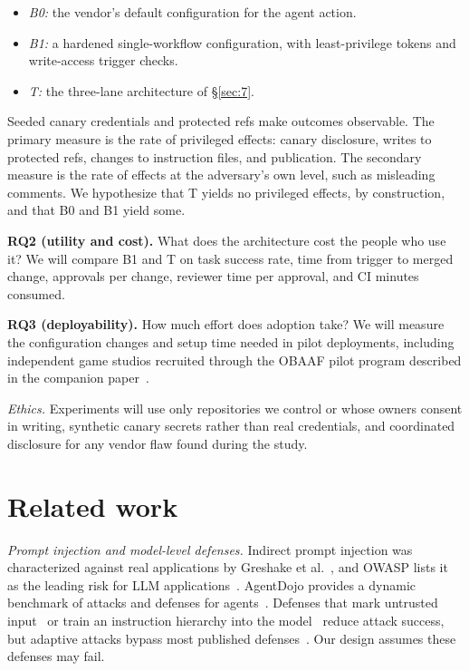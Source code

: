 \documentclass[acmsmall,screen,review]{acmart}
\begin{document}
\begin{itemize}
\item \emph{B0:} the vendor's default configuration for the agent action.
\item \emph{B1:} a hardened single-workflow configuration, with least-privilege tokens and write-access trigger checks.
\item \emph{T:} the three-lane architecture of \S\ref{sec:7}.
\end{itemize}

Seeded canary credentials and protected refs make outcomes observable. The primary measure is the rate of privileged effects: canary disclosure, writes to protected refs, changes to instruction files, and publication. The secondary measure is the rate of effects at the adversary's own level, such as misleading comments. We hypothesize that T yields no privileged effects, by construction, and that B0 and B1 yield some.

\textbf{RQ2 (utility and cost).} What does the architecture cost the people who use it? We will compare B1 and T on task success rate, time from trigger to merged change, approvals per change, reviewer time per approval, and CI minutes consumed.

\textbf{RQ3 (deployability).} How much effort does adoption take? We will measure the configuration changes and setup time needed in pilot deployments, including independent game studios recruited through the OBAAF pilot program described in the companion paper~\cite{keluoudeke2026securing}.

\emph{Ethics.} Experiments will use only repositories we control or whose owners consent in writing, synthetic canary secrets rather than real credentials, and coordinated disclosure for any vendor flaw found during the study.


\section{Related work}\label{sec:10}

\emph{Prompt injection and model-level defenses.} Indirect prompt injection was characterized against real applications by Greshake et al.~\cite{greshake2023not}, and OWASP lists it as the leading risk for LLM applications~\cite{owaspndowasp}. AgentDojo provides a dynamic benchmark of attacks and defenses for agents~\cite{debenedetti2024agentdojo}. Defenses that mark untrusted input~\cite{hines2024defending} or train an instruction hierarchy into the model~\cite{wallace2024instruction} reduce attack success, but adaptive attacks bypass most published defenses~\cite{nasr2025attacker}. Our design assumes these defenses may fail.
\end{document}
